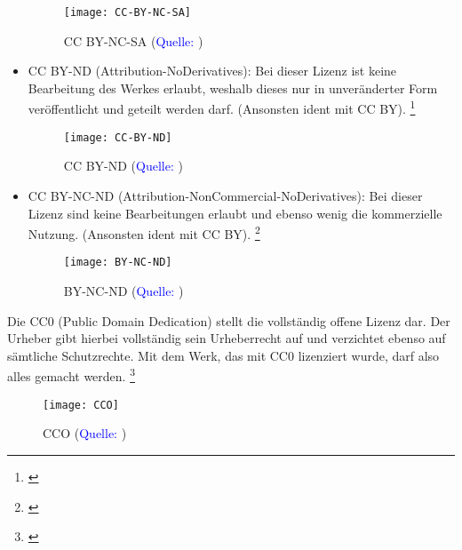 \documentclass[titlepage,12pt,twoside]{article}
\begin{document}
\begin{itemize}
	\begin{figure}[H]
		\begin{center}
			\scalebox{0.4}
			{\texttt{[image: CC-BY-NC-SA]}}
			\caption{CC BY-NC-SA (\textcolor{blue}{Quelle: \cite{CreativeCommonsBilder}})}
			\label{fig:CC BY-NC-SA}
		\end{center}
	\end{figure}
	\hfill \break
	\item CC BY-ND (Attribution-NoDerivatives): Bei dieser  Lizenz ist keine Bearbeitung des Werkes erlaubt, 
	weshalb dieses nur in unveränderter Form veröffentlicht und geteilt werden darf. (Ansonsten ident mit CC BY). \footnote{\cite{bpb}}
	\begin{figure}[H]
		\begin{center}
			\scalebox{0.4}
			{\texttt{[image: CC-BY-ND]}}
			\caption{CC BY-ND (\textcolor{blue}{Quelle: \cite{CreativeCommonsBilder}})}
			\label{fig:CC BY-ND}
		\end{center}
	\end{figure}
	\hfill \break
	\item CC BY-NC-ND (Attribution-NonCommercial-NoDerivatives): Bei dieser  
	Lizenz sind keine Bearbeitungen erlaubt und ebenso wenig die kommerzielle Nutzung. (Ansonsten ident mit CC BY). \footnote{\cite{bpb}}
	\begin{figure}[H]
		\begin{center}
			\scalebox{0.4}
			{\texttt{[image: BY-NC-ND]}}
			\caption{BY-NC-ND (\textcolor{blue}{Quelle: \cite{CreativeCommonsBilder}})}
			\label{fig:BY-NC-ND}
		\end{center}
	\end{figure}
	\hfill \break
\end{itemize}
\hfill \break
Die CC0 (Public Domain Dedication) stellt die vollständig offene Lizenz dar. Der Urheber gibt hierbei vollständig sein Urheberrecht auf und 
verzichtet ebenso auf sämtliche Schutzrechte. Mit dem Werk, das mit CC0 lizenziert wurde, darf also alles gemacht werden. \footnote{\cite{CreativeComonsLizenz}} \\
\begin{figure}[H]
	\begin{center}
		\scalebox{0.4}
		{\texttt{[image: CCO]}}
		\caption{CCO (\textcolor{blue}{Quelle: \cite{CreativeCommonsBilder}})}
		\label{fig:CCO}
	\end{center}
\end{figure}
\end{document}
